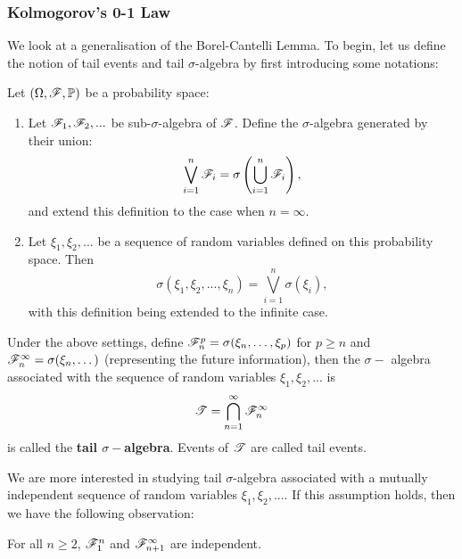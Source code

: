 \subsubsection{Kolmogorov's 0-1 Law}
We look at a generalisation of the Borel-Cantelli Lemma. To begin, let us define the notion of tail events and tail $\sigma$-algebra by first introducing some notations:
\begin{definition} \label{def:discrete_natural_filtration}
Let $(\Omega, \mathcal{F}, \mathbb{P})$ be a probability space: 
\begin{enumerate}
    \item Let $\mathcal{F}_1, \mathcal{F}_2, ...$ be sub-$\sigma$-algebra of $\mathcal{F}$. Define the $\sigma$-algebra generated by their union:
    \begin{equation}
        \bigvee_{i=1}^n \mathcal{F}_i = \sigma\left( \bigcup_{i=1}^n \mathcal{F}_i \right),
    \end{equation}
    and extend this definition to the case when $n=\infty$.
    \item Let $\xi_1, \xi_2,...$ be a sequence of random variables defined on this probability space. Then
    \begin{equation}
        \sigma(\xi_1,\xi_2,...,\xi_n) = \bigvee_{i=1}^n \sigma(\xi_i),
    \end{equation}
    with this definition being extended to the infinite case.
\end{enumerate}
\end{definition}

\begin{definition}
Under the above settings, define $\mathcal{F}_n^p = \sigma (\xi_n, \dots, \xi_p)$ for $p\geq n$ and $\mathcal{F}_n^\infty = \sigma (\xi_n, \dots)$ (representing the future information), then the $\sigma-$ algebra associated with the sequence of random variables $\xi_1, \xi_2, ...$ is
\begin{equation*}
    \mathcal{T} = \bigcap_{n=1}^\infty \mathcal{F}_n^\infty
\end{equation*}
is called the \textbf{tail $\sigma-$algebra}. Events of $\mathcal{T}$ are called tail events.
\end{definition}

We are more interested in studying tail $\sigma$-algebra associated with a mutually independent sequence of random variables $\xi_1, \xi_2, ...$. If this assumption holds, then we have the following observation:
\begin{lemma}
For all $n \geq 2$, $\mathcal{F}_1^n$ and $\mathcal{F}_{n+1}^\infty$ are independent.
\end{lemma}


